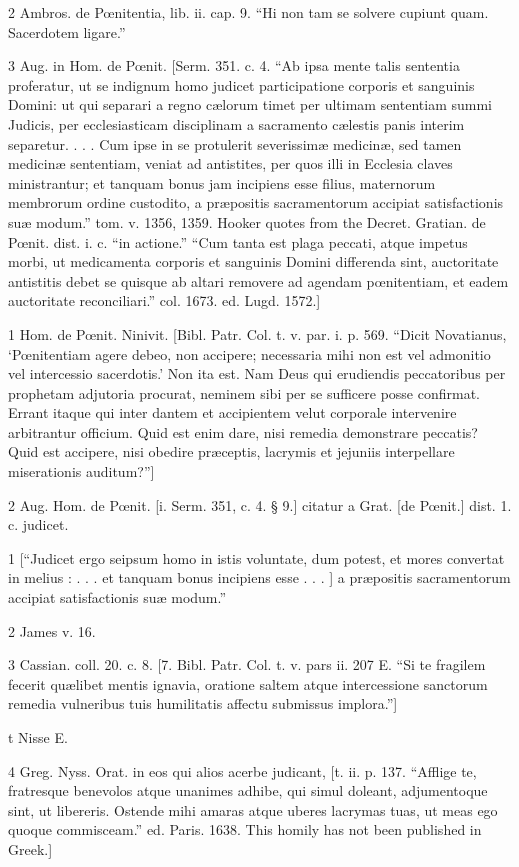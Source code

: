 2
Ambros. de Pœnitentia, lib. ii. cap. 9. “Hi non tam se solvere cupiunt quam. Sacerdotem ligare.”

3
Aug. in Hom. de Pœnit. [Serm. 351. c. 4. “Ab ipsa mente talis sententia proferatur, ut se indignum homo judicet participatione corporis et sanguinis Domini: ut qui separari a regno cælorum timet per ultimam sententiam summi Judicis, per ecclesiasticam disciplinam a sacramento cælestis panis interim separetur. . . . Cum ipse in se protulerit severissimæ medicinæ, sed tamen medicinæ sententiam, veniat ad antistites, per quos illi in Ecclesia claves ministrantur; et tanquam bonus jam incipiens esse filius, maternorum membrorum ordine custodito, a præpositis sacramentorum accipiat satisfactionis suæ modum.” tom. v. 1356, 1359. Hooker quotes from the Decret. Gratian. de Pœnit. dist. i. c. “in actione.” “Cum tanta est plaga peccati, atque impetus morbi, ut medicamenta corporis et sanguinis Domini differenda sint, auctoritate antistitis debet se quisque ab altari removere ad agendam pœnitentiam, et eadem auctoritate reconciliari.” col. 1673. ed. Lugd. 1572.]

1
Hom. de Pœnit. Ninivit. [Bibl. Patr. Col. t. v. par. i. p. 569. “Dicit Novatianus, ‘Pœnitentiam agere debeo, non accipere; necessaria mihi non est vel admonitio vel intercessio sacerdotis.’ Non ita est. Nam Deus qui erudiendis peccatoribus per prophetam adjutoria procurat, neminem sibi per se sufficere posse confirmat. Errant itaque qui inter dantem et accipientem velut corporale intervenire arbitrantur officium. Quid est enim dare, nisi remedia demonstrare peccatis? Quid est accipere, nisi obedire præceptis, lacrymis et jejuniis interpellare miserationis auditum?”]

2
Aug. Hom. de Pœnit. [i. Serm. 351, c. 4. § 9.] citatur a Grat. [de Pœnit.] dist. 1. c. judicet.

1
[“Judicet ergo seipsum homo in istis voluntate, dum potest, et mores convertat in melius : . . . et tanquam bonus incipiens esse . . . ] a præpositis sacramentorum accipiat satisfactionis suæ modum.”

2
James v. 16.

3
Cassian. coll. 20. c. 8. [7. Bibl. Patr. Col. t. v. pars ii. 207 E. “Si te fragilem fecerit quælibet mentis ignavia, oratione saltem atque intercessione sanctorum remedia vulneribus tuis humilitatis affectu submissus implora.”]

t
Nisse E.

4
Greg. Nyss. Orat. in eos qui alios acerbe judicant, [t. ii. p. 137. “Afflige te, fratresque benevolos atque unanimes adhibe, qui simul doleant, adjumentoque sint, ut libereris. Ostende mihi amaras atque uberes lacrymas tuas, ut meas ego quoque commisceam.” ed. Paris. 1638. This homily has not been published in Greek.]

